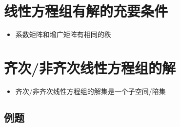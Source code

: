 \section{线性方程组有解的充要条件}
\begin{itemize}
	\item 系数矩阵和增广矩阵有相同的秩
\end{itemize}

\section{齐次/非齐次线性方程组的解}
\begin{itemize}
	\item 齐次/非齐次线性方程组的解集是一个子空间/陪集
\end{itemize}

\subsection*{例题}
